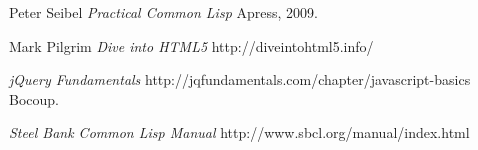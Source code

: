 \documentclass[11pt]{article}
\begin{document}

\pagebreak

\pagebreak

\pagebreak

\pagebreak

\pagebreak

\pagebreak

\pagebreak

\pagebreak
\begin{thebibliography}{9}
  Peter Seibel
  \emph{Practical Common Lisp}
  Apress,
  2009.

  Mark Pilgrim
  \emph{Dive into HTML5}
  http://diveintohtml5.info/


  \emph{jQuery Fundamentals}
  http://jqfundamentals.com/chapter/javascript-basics
  Bocoup.

  \emph{Steel Bank Common Lisp Manual}
  http://www.sbcl.org/manual/index.html

\end{thebibliography}
\end{document}
